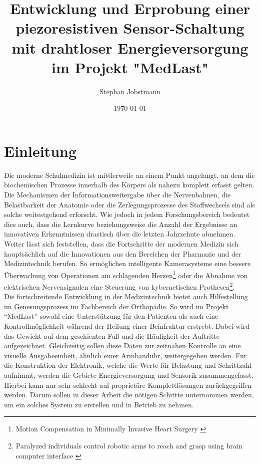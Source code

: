 \documentclass[12pt]{scrreprt} %
\title{Entwicklung und Erprobung einer piezoresistiven Sensor-Schaltung mit drahtloser Energieversorgung im Projekt "MedLast"}
\author{Stephan Jobstmann}
\date{\today}
\begin{document}
\maketitle
\setcounter {page}{1}
\def\chapterpagestyle{fancy}
\tableofcontents
\listoffigures
\lstlistoflistings
\listoftables
\lstset{language =C}
\chapter{Einleitung}
Die moderne Schulmedizin ist mittlerweile an einem Punkt angelangt, an dem die biochemischen Prozesse innerhalb des Körpers als nahezu komplett erfasst gelten. Die Mechanismen der Informationsweitergabe über die Nervenbahnen, die Belastbarkeit der Anatomie oder die Zerlegungsprozesse des Stoffwechsels sind als solche weitestgehend erforscht. Wie jedoch in jedem Forschungsbereich bedeutet dies auch, dass die Lernkurve beziehungsweise die Anzahl der Ergebnisse an innovativen Erkenntnissen drastisch über die letzten Jahrzehnte abnehmen. Weiter lässt sich feststellen, dass die Fortschritte der modernen Medizin sich hauptsächlich auf die Innovationen aus den Bereichen der Pharmazie und der Medizintechnik berufen. So ermöglichen intelligente Kamerasysteme eine bessere Überwachung von Operationen am schlagenden Herzen\footnote{Motion Compensation in Minimally Invasive Heart Surgery \citep{DLR}} oder die Abnahme von elektrischen Nervensignalen eine Steuerung von kybernetischen Prothesen\footnote{Paralyzed individuals control robotic arms to reach and grasp using brain computer interface \citep{DLR2}}.\\
Die fortschreitende Entwicklung in der Medizintechnik bietet auch Hilfestellung im Genesungsprozess im Fachbereich der Orthopädie. So wird im Projekt "`MedLast"' sowohl eine Unterstützung für den Patienten als auch eine Kontrollmöglichkeit während der Heilung einer Beinfraktur erstrebt. Dabei wird das Gewicht auf dem geschienten Fuß und die Häufigkeit der Auftritte aufgezeichnet. Gleichzeitig sollen diese Daten zur zeitnahen Kontrolle an eine visuelle Ausgabeeinheit, ähnlich einer Armbanduhr, weitergegeben werden. Für die Konstruktion der Elektronik, welche die Werte für Belastung und Schrittzahl aufnimmt, werden die Gebiete Energieversorgung und Sensorik zusammengefasst. Hierbei kann nur sehr schlecht auf proprietäre Komplettlösungen zurückgegriffen werden. Darum sollen in dieser Arbeit die nötigen Schritte unternommen werden, um ein solches System zu erstellen und in Betrieb zu nehmen.
\end{document}
